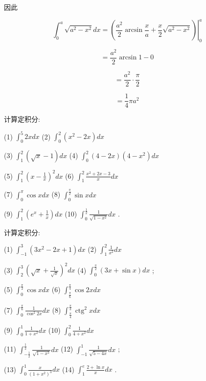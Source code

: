 \documentclass[lang=cn,newtx,10pt,scheme=chinese]{elegantbook}
\begin{document}
因此

\[
{\int }_{0}^{a}\sqrt{{a}^{2} - {x}^{2}}{dx} = {\left. \left( \frac{{a}^{2}}{2}\arcsin \frac{x}{a} + \frac{x}{2}\sqrt{{a}^{2} - {x}^{2}}\right) \right| }_{0}^{a}
\]

\[
= \frac{{a}^{2}}{2}\arcsin 1 - 0
\]

\[
= \frac{{a}^{2}}{2} \cdot \frac{\pi }{2}
\]

\[
= \frac{1}{4}\pi {a}^{2}
\]

\begin{problemset}[练习]

\item 计算定积分:

(1) \({\int }_{0}^{5}{2xdx}\) (2) \({\int }_{0}^{2}\left( {{x}^{2} - {2x}}\right) {dx}\)

(3) \({\int }_{1}^{2}\left( {\sqrt{x} - 1}\right) {dx}\) (4) \({\int }_{0}^{2}\left( {4 - {2x}}\right) \left( {4 - {x}^{2}}\right) {dx}\)

(5) \({\int }_{1}^{2}{\left( x - \frac{1}{x}\right) }^{2}{dx}\) (6) \({\int }_{1}^{2}\frac{{x}^{2} + {2x} - 3}{x}{dx}\)

(7) \({\int }_{0}^{\pi }\cos {xdx}\) (8) \({\int }_{0}^{\frac{\pi }{2}}\sin {xdx}\)

(9) \({\int }_{1}^{2}\left( {{e}^{x} + \frac{1}{x}}\right) {dx}\) (10) \({\int }_{0}^{\frac{1}{2}}\frac{1}{\sqrt{1 - {x}^{2}}}{dx}\) .

\end{problemset}

\begin{problemset}[习 题 十 五]

\item 计算定积分:

(1) \({\int }_{-1}^{3}\left( {3{x}^{2} - {2x} + 1}\right) {dx}\) (2) \({\int }_{1}^{2}\frac{1}{{x}^{2}}{dx}\)

(3) \({\int }_{2}^{3}{\left( \sqrt{x} + \frac{1}{\sqrt{x}}\right) }^{2}{dx}\) (4) \({\int }_{0}^{\frac{\pi }{2}}\left( {{3x} + \sin x}\right) {dx}\) ;

(5) \({\int }_{0}^{\frac{\pi }{2}}\cos {xdx}\) (6) \({\int }_{\frac{\pi }{6}}^{\frac{\pi }{4}}\cos {2xdx}\)

(7) \({\int }_{0}^{\frac{\pi }{6}}\frac{1}{{\cos }^{2}{2x}}{dx}\) (8) \({\int }_{\frac{\pi }{4}}^{\frac{\pi }{3}}{\operatorname{ctg}}^{2}{xdx}\)

(9) \({\int }_{0}^{1}\frac{1}{1 + {x}^{2}}{dx}\) (10) \({\int }_{0}^{2}\frac{1}{4 + {x}^{2}}{dx}\)

(11) \({\int }_{-\frac{1}{2}}^{\frac{1}{2}}\frac{1}{\sqrt{1 - {x}^{2}}}{dx}\) (12) \({\int }_{-1}^{1}\frac{1}{\sqrt{5 - {4x}}}{dx}\) ;

(13) \({\int }_{0}^{1}\frac{x}{{\left( 1 + {x}^{2}\right) }^{3}}{dx}\) (14) \({\int }_{1}^{e}\frac{2 + \ln x}{x}{dx}\) .

\end{problemset}
\end{document}
